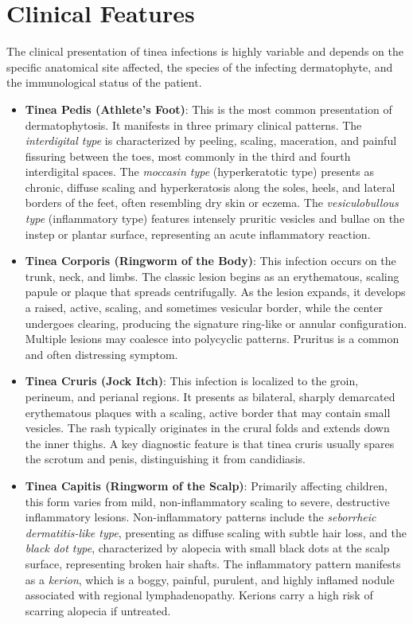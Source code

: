 \section*{Clinical Features}
The clinical presentation of tinea infections is highly variable and depends on the specific anatomical site affected, the species of the infecting dermatophyte, and the immunological status of the patient.
\begin{itemize}
    \item \textbf{Tinea Pedis (Athlete's Foot)}: This is the most common presentation of dermatophytosis. It manifests in three primary clinical patterns. The \textit{interdigital type} is characterized by peeling, scaling, maceration, and painful fissuring between the toes, most commonly in the third and fourth interdigital spaces. The \textit{moccasin type} (hyperkeratotic type) presents as chronic, diffuse scaling and hyperkeratosis along the soles, heels, and lateral borders of the feet, often resembling dry skin or eczema. The \textit{vesiculobullous type} (inflammatory type) features intensely pruritic vesicles and bullae on the instep or plantar surface, representing an acute inflammatory reaction.
    \item \textbf{Tinea Corporis (Ringworm of the Body)}: This infection occurs on the trunk, neck, and limbs. The classic lesion begins as an erythematous, scaling papule or plaque that spreads centrifugally. As the lesion expands, it develops a raised, active, scaling, and sometimes vesicular border, while the center undergoes clearing, producing the signature ring-like or annular configuration. Multiple lesions may coalesce into polycyclic patterns. Pruritus is a common and often distressing symptom.
    \item \textbf{Tinea Cruris (Jock Itch)}: This infection is localized to the groin, perineum, and perianal regions. It presents as bilateral, sharply demarcated erythematous plaques with a scaling, active border that may contain small vesicles. The rash typically originates in the crural folds and extends down the inner thighs. A key diagnostic feature is that tinea cruris usually spares the scrotum and penis, distinguishing it from candidiasis.
    \item \textbf{Tinea Capitis (Ringworm of the Scalp)}: Primarily affecting children, this form varies from mild, non-inflammatory scaling to severe, destructive inflammatory lesions. Non-inflammatory patterns include the \textit{seborrheic dermatitis-like type}, presenting as diffuse scaling with subtle hair loss, and the \textit{black dot type}, characterized by alopecia with small black dots at the scalp surface, representing broken hair shafts. The inflammatory pattern manifests as a \textit{kerion}, which is a boggy, painful, purulent, and highly inflamed nodule associated with regional lymphadenopathy. Kerions carry a high risk of scarring alopecia if untreated.

\end{itemize}
